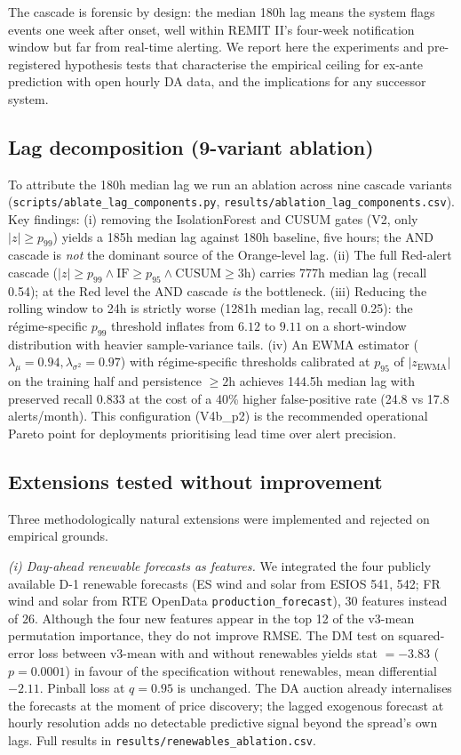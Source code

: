 \documentclass[11pt,a4paper]{article}
\begin{document}
The cascade is forensic by design: the median 180h lag means the
system flags events one week after onset, well within REMIT II's
four-week notification window but far from real-time alerting. We
report here the experiments and pre-registered hypothesis tests that
characterise the empirical ceiling for ex-ante prediction with open
hourly DA data, and the implications for any successor system.

\subsection{Lag decomposition (9-variant ablation)}\label{sec:lag-ablation}

To attribute the 180h median lag we run an ablation across nine
cascade variants (\texttt{scripts/ablate\_lag\_components.py},
\texttt{results/ablation\_lag\_components.csv}). Key findings:
(i) removing the IsolationForest and CUSUM gates (V2, only
$|z| \geq p_{99}$) yields a 185h median lag against 180h baseline,
five hours; the AND cascade is \emph{not} the dominant source of
the Orange-level lag. (ii) The full Red-alert cascade
($|z| \geq p_{99} \wedge \mathrm{IF} \geq p_{95} \wedge
\mathrm{CUSUM} \geq 3$h) carries 777h median lag (recall 0.54);
at the Red level the AND cascade \emph{is} the bottleneck.
(iii) Reducing the rolling window to 24h is strictly worse
(1281h median lag, recall 0.25): the régime-specific $p_{99}$
threshold inflates from $6.12$ to $9.11$ on a short-window
distribution with heavier sample-variance tails. (iv) An EWMA
estimator ($\lambda_\mu = 0.94, \lambda_{\sigma^2} = 0.97$) with
régime-specific thresholds calibrated at $p_{95}$ of $|z_{\text{EWMA}}|$
on the training half and persistence $\geq 2$h achieves 144.5h
median lag with preserved recall 0.833 at the cost of a 40\% higher
false-positive rate (24.8 vs 17.8 alerts/month). This configuration
(V4b\_p2) is the recommended operational Pareto point for
deployments prioritising lead time over alert precision.

\subsection{Extensions tested without improvement}\label{sec:extensions}

Three methodologically natural extensions were implemented and
rejected on empirical grounds.

\emph{(i) Day-ahead renewable forecasts as features.} We integrated
the four publicly available D-1 renewable forecasts (ES wind and
solar from ESIOS 541, 542; FR wind and solar from RTE OpenData
\texttt{production\_forecast}), $30$ features instead of $26$.
Although the four new features appear in the top 12 of the v3-mean
permutation importance, they do not improve RMSE. The DM test on
squared-error loss between v3-mean with and without renewables
yields stat $= -3.83$ ($p = 0.0001$) in favour of the specification
without renewables, mean differential $-2.11$. Pinball loss at
$q = 0.95$ is unchanged. The DA auction already internalises the
forecasts at the moment of price discovery; the lagged exogenous
forecast at hourly resolution adds no detectable predictive signal
beyond the spread's own lags. Full results in
\texttt{results/renewables\_ablation.csv}.
\end{document}
